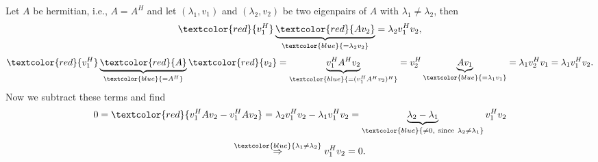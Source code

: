 {\begin{enumerate}
%	
	Let $A$ be hermitian, i.e., $A=A^H$ and let $(\lambda_1,v_1)$ and $(\lambda_2,v_2)$ be two eigenpairs of $A$ with $\lambda_1\neq\lambda_2$, then
	$$
	\textcolor{red}{v_1^H}\underbrace{\textcolor{red}{Av_2}}_{\textcolor{blue}{=\lambda_2v_2}} = \lambda_2v_1^Hv_2,
	$$ 
	$$ \textcolor{red}{v_1^H}\underbrace{\textcolor{red}{A}}_{\textcolor{blue}{=A^H}}\textcolor{red}{v_2} = \underbrace{v_1^HA^Hv_2}_{\textcolor{blue}{=(v_1^HA^Hv_2)^H}} = v_2^H\underbrace{Av_1}_{\textcolor{blue}{=\lambda_1v_1}} = \lambda_1v_2^Hv_1 = \lambda_1v_1^Hv_2. 
	$$
	Now we subtract these terms and find 
	$$
	0=\textcolor{red}{v_1^HAv_2-v_1^HAv_2} = \lambda_2v_1^Hv_2 - \lambda_1v_1^Hv_2 = \underbrace{\lambda_2-\lambda_1}_{\textcolor{blue}{\neq 0,\  \text{since}\ \lambda_2\neq\lambda_1}}v_1^Hv_2
	$$
	$$
	\stackrel{\textcolor{blue}{\lambda_1\neq\lambda_2}}{\Rightarrow} v_1^Hv_2 = 0.
	$$
\end{enumerate}


}